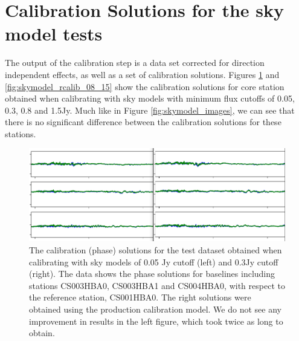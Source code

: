 \appendix

\renewcommand{\theequ}{\Alph{section}.\arabic{equ}}


\section{Calibration Solutions for the sky model tests }\label{ap:calib_solutions}
The output of the calibration step is a data set corrected for direction independent effects, as well as a set of calibration solutions. Figures \ref{fig:skymodel_rcalib_004_03} and \ref{fig:skymodel_rcalib_08_15} show the calibration solutions for core station obtained when calibrating with  sky models with minimum flux cutoffs of 0.05, 0.3, 0.8 and 1.5Jy. Much like in Figure \ref{fig:skymodel_images}, we can see that there is no significant difference between the calibration solutions for these stations. 

\begin{figure}
    \includegraphics[width=0.95\linewidth]{figures/005_and_03_solutsions_CS003HBA0_CS003HBA1_CS004HBA0.png}
      \caption{The calibration (phase) solutions for the test dataset obtained when calibrating with sky models of 0.05 Jy cutoff (left) and 0.3Jy cutoff (right). The data shows the phase solutions for baselines including stations CS003HBA0, CS003HBA1 and CS004HBA0, with respect to the reference station, CS001HBA0. The right solutions were obtained using the production calibration model. We do not see any improvement in results in the left figure, which took twice as long to obtain.}
	\label{fig:skymodel_rcalib_004_03}
\end{figure}


